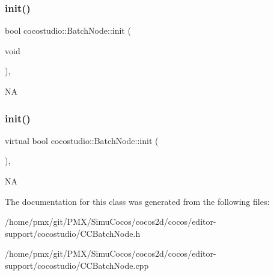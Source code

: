 \subsubsection{\texorpdfstring{init()}{init()}\hspace{0.1cm}{\footnotesize\ttfamily [1/2]}}
{\footnotesize\ttfamily bool cocostudio\+::\+Batch\+Node\+::init (\begin{DoxyParamCaption}\item[{void}]{ }\end{DoxyParamCaption})\hspace{0.3cm}{\ttfamily [override]}, {\ttfamily [virtual]}}

NA \mbox{\label{classcocostudio_1_1BatchNode_aa1d162d7257c613d8afd67a9282a2b79}} 
\subsubsection{\texorpdfstring{init()}{init()}\hspace{0.1cm}{\footnotesize\ttfamily [2/2]}}
{\footnotesize\ttfamily virtual bool cocostudio\+::\+Batch\+Node\+::init (\begin{DoxyParamCaption}{ }\end{DoxyParamCaption})\hspace{0.3cm}{\ttfamily [override]}, {\ttfamily [virtual]}}

NA 

The documentation for this class was generated from the following files\+:\begin{DoxyCompactItemize}
\item 
/home/pmx/git/\+P\+M\+X/\+Simu\+Cocos/cocos2d/cocos/editor-\/support/cocostudio/C\+C\+Batch\+Node.\+h\item 
/home/pmx/git/\+P\+M\+X/\+Simu\+Cocos/cocos2d/cocos/editor-\/support/cocostudio/C\+C\+Batch\+Node.\+cpp\end{DoxyCompactItemize}
